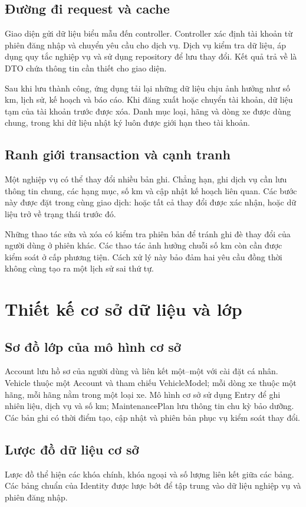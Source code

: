 \subsection{Đường đi request và cache}
Giao diện gửi dữ liệu biểu mẫu đến controller. Controller xác định tài khoản từ phiên đăng nhập và chuyển yêu cầu cho dịch vụ. Dịch vụ kiểm tra dữ liệu, áp dụng quy tắc nghiệp vụ và sử dụng repository để lưu thay đổi. Kết quả trả về là DTO chứa thông tin cần thiết cho giao diện.

Sau khi lưu thành công, ứng dụng tải lại những dữ liệu chịu ảnh hưởng như số km, lịch sử, kế hoạch và báo cáo. Khi đăng xuất hoặc chuyển tài khoản, dữ liệu tạm của tài khoản trước được xóa. Danh mục loại, hãng và dòng xe được dùng chung, trong khi dữ liệu nhật ký luôn được giới hạn theo tài khoản.

\subsection{Ranh giới transaction và cạnh tranh}
Một nghiệp vụ có thể thay đổi nhiều bản ghi. Chẳng hạn, ghi dịch vụ cần lưu thông tin chung, các hạng mục, số km và cập nhật kế hoạch liên quan. Các bước này được đặt trong cùng giao dịch: hoặc tất cả thay đổi được xác nhận, hoặc dữ liệu trở về trạng thái trước đó.

Những thao tác sửa và xóa có kiểm tra phiên bản để tránh ghi đè thay đổi của người dùng ở phiên khác. Các thao tác ảnh hưởng chuỗi số km còn cần được kiểm soát ở cấp phương tiện. Cách xử lý này bảo đảm hai yêu cầu đồng thời không cùng tạo ra một lịch sử sai thứ tự.

\section{Thiết kế cơ sở dữ liệu và lớp}
\subsection{Sơ đồ lớp của mô hình cơ sở}
Account lưu hồ sơ của người dùng và liên kết một--một với cài đặt cá nhân. Vehicle thuộc một Account và tham chiếu VehicleModel; mỗi dòng xe thuộc một hãng, mỗi hãng nằm trong một loại xe. Mô hình cơ sở sử dụng Entry để ghi nhiên liệu, dịch vụ và số km; MaintenancePlan lưu thông tin chu kỳ bảo dưỡng. Các bản ghi có thời điểm tạo, cập nhật và phiên bản phục vụ kiểm soát thay đổi.
\subsection{Lược đồ dữ liệu cơ sở}
Lược đồ thể hiện các khóa chính, khóa ngoại và số lượng liên kết giữa các bảng. Các bảng chuẩn của Identity được lược bớt để tập trung vào dữ liệu nghiệp vụ và phiên đăng nhập.

